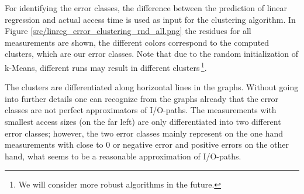 \documentclass{superfri}
\begin{document}

For identifying the error classes, the difference between the prediction of linear regression and actual access time is used as input for the clustering algorithm.
In Figure \ref{src/linreg_error_clustering_rnd_all.png} the residues for all measurements are shown, the different colors correspond to the computed clusters, which are our error classes. 
Note that due to the random initialization of k-Means, different runs may result in different clusters\,\footnote{We will consider more robust algorithms in the future.}.


The clusters are differentiated along horizontal lines in the graphs.
Without going into further details one can recognize from the graphs already that the error classes are not perfect approximators of I/O-paths.
The measurements with smallest access sizes (on the far left) are only differentiated into two different error classes; however, the two error classes mainly represent  on the one hand measurements with close to 0 or negative error and positive errors on the other hand, what seems to be a reasonable approximation of I/O-paths.\medskip
\end{document}
